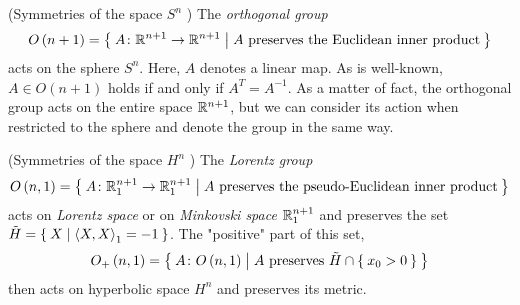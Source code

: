 \documentclass[../main.tex]{subfiles}
\begin{document}
\begin{definition}(Symmetries of the space $S^n$ {\autocite[][Chapter~7A]{kuhnelwolfgang_2006}})\label{Group:Sphere}
The \textit{orthogonal group}
\begin{equation*}
O\left(n+1\right)
=
\Set{A\colon\mathbb{R}^{n+1}\to\mathbb{R}^{n+1}|\text{$A$ preserves the Euclidean inner product}}
\end{equation*}
acts on the sphere $S^n$.
Here, $A$ denotes a linear map.
As is well-known, $A\in O\left(n+1\right)$ holds if and only if $A^T=A^{-1}$.
As a matter of fact, the orthogonal group acts on the entire space $\mathbb{R}^{n+1}$,
but we can consider its action when restricted to the sphere and denote the group in the same way.
\end{definition}
\begin{definition}(Symmetries of the space $H^n$ {\autocite[][Chapter~7A]{kuhnelwolfgang_2006}})\label{Group:Hyperbolic}
The \textit{Lorentz group}
\begin{equation*}
O\left(n,1\right)
=
\Set{A\colon\mathbb{R}^{n+1}_1\to\mathbb{R}^{n+1}_1|\text{$A$ preserves the pseudo-Euclidean inner product}}
\end{equation*}
acts on \textit{Lorentz space} or on \textit{Minkovski space} $\mathbb{R}^{n+1}_1$
and preserves the set $\tilde{H}=\Set{X|\left\langle{X},{X}\right\rangle_1=-1}$.
The "positive" part of this set,
\begin{equation*}
O_{+}\left(n,1\right)
=
\Set{A\colon O\left(n,1\right)|\text{$A$ preserves $\tilde{H}\cap\Set{x_0>0}$}}
\end{equation*}
then acts on hyperbolic space $H^n$ and preserves its metric.
\end{definition}
\end{document}
